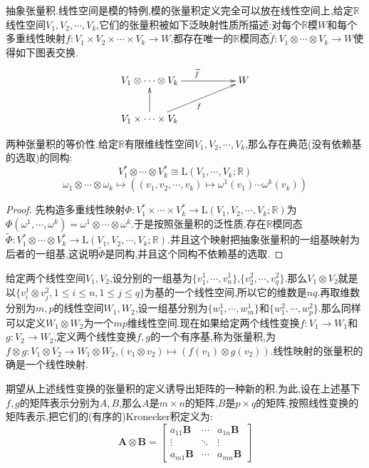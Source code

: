 抽象张量积.线性空间是模的特例,模的张量积定义完全可以放在线性空间上,给定$\mathbb{R}$线性空间$V_1,V_2,\cdots,V_k$,它们的张量积被如下泛映射性质所描述:对每个$\mathbb{R}$模$W$和每个多重线性映射$f:V_1\times V_2\times\cdots\times V_k\to W$,都存在唯一的$\mathbb{R}$模同态$\widetilde{f}:V_1\otimes\cdots\otimes V_k\to W$使得如下图表交换.
$$\xymatrix{V_1\otimes\cdots\otimes V_k\ar[rr]^{\widetilde{f}}&&W\\V_1\times\cdots\times V_k\ar[u]\ar[urr]_f&&}$$

两种张量积的等价性.给定$\mathbb{R}$有限维线性空间$V_1,V_2,\cdots,V_k$,那么存在典范(没有依赖基的选取)的同构:
$$V_1^*\otimes\cdots\otimes V_k^*\cong\mathrm{L}(V_1,\cdots,V_k;\mathbb{R})$$
$$\omega_1\otimes\cdots\otimes\omega_k\mapsto\left((v_1,v_2,\cdots,v_k)\mapsto\omega^1(v_1)\cdots\omega^k(v_k)\right)$$
\begin{proof}
	
	先构造多重线性映射$\Phi:V_1^*\times\cdots\times V_k^*\to\mathrm{L}(V_1,V_2,\cdots,V_k;\mathbb{R})$为$\Phi(\omega^1,\cdots,\omega^k)=\omega^1\otimes\cdots\otimes\omega^k$.于是按照张量积的泛性质,存在$\mathbb{R}$模同态$\widetilde{\Phi}:V_1^*\otimes\cdots\otimes V_k^*\to\mathrm{L}(V_1,V_2,\cdots,V_k;\mathbb{R})$.并且这个映射把抽象张量积的一组基映射为后者的一组基,这说明$\widetilde{\Phi}$是同构,并且这个同构不依赖基的选取.
\end{proof}

















给定两个线性空间$V_1,V_2$,设分别的一组基为$\{v_1^{1},\cdots,v_n^1\}$,$\{v_2^2,\cdots,v_q^2\}$.那么$V_1\otimes V_2$就是以$\{v_i^1\otimes v_j^2,1\le i\le n,1\le j\le q\}$为基的一个线性空间,所以它的维数是$nq$.再取维数分别为$m,p$的线性空间$W_1,W_2$,设一组基分别为$\{w_1^1,\cdots,w_m^1\}$和$\{w_1^2,\cdots,w_p^2\}$.那么同样可以定义$W_1\otimes W_2$为一个$mp$维线性空间.现在如果给定两个线性变换$f:V_1\to W_1$和$g:V_2\to W_2$,定义两个线性变换$f,g$的一个有序基,称为张量积,为$f\otimes g:V_1\otimes V_2\to W_1\otimes W_2$,$(v_1\otimes v_2)\mapsto(f(v_1)\otimes g(v_2))$.线性映射的张量积的确是一个线性映射.

期望从上述线性变换的张量积的定义诱导出矩阵的一种新的积.为此,设在上述基下$f,g$的矩阵表示分别为$A,B$,那么$A$是$m\times n$的矩阵,$B$是$p\times q$的矩阵,按照线性变换的矩阵表示,把它们的(有序的)Kronecker积定义为:
$$\mathbf{A}\otimes\mathbf{B} = \begin{bmatrix} a_{11} \mathbf{B} & \cdots & a_{1n}\mathbf{B} \\ \vdots & \ddots & \vdots \\ a_{m1} \mathbf{B} & \cdots & a_{mn} \mathbf{B} \end{bmatrix}$$

